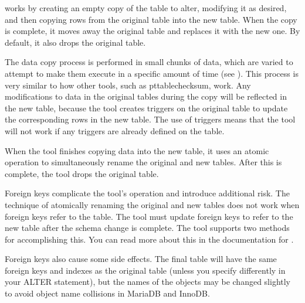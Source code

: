 \documentclass[letterpaper,10pt,english]{sphinxmanual}
\begin{document}
\sphinxAtStartPar
{} works by creating an empty copy of the table to alter,
modifying it as desired, and then copying rows from the original table into the
new table. When the copy is complete, it moves away the original table and
replaces it with the new one.  By default, it also drops the original table.

\sphinxAtStartPar
The data copy process is performed in small chunks of data, which are varied to
attempt to make them execute in a specific amount of time (see
{\hyperref[\detokenize{mariadb-schema-change:cmdoption-mariadb-schema-change-chunk-time}]{}}).  This process is very similar to how other tools, such as
pt\sphinxhyphen{}table\sphinxhyphen{}checksum, work.  Any modifications to data in the original tables
during the copy will be reflected in the new table, because the tool creates
triggers on the original table to update the corresponding rows in the new
table.  The use of triggers means that the tool will not work if any triggers
are already defined on the table.

\sphinxAtStartPar
When the tool finishes copying data into the new table, it uses an atomic
 operation to simultaneously rename the original and new tables.
After this is complete, the tool drops the original table.

\sphinxAtStartPar
Foreign keys complicate the tool’s operation and introduce additional risk.  The
technique of atomically renaming the original and new tables does not work when
foreign keys refer to the table. The tool must update foreign keys to refer to
the new table after the schema change is complete. The tool supports two methods
for accomplishing this. You can read more about this in the documentation for
{\hyperref[\detokenize{mariadb-schema-change:cmdoption-mariadb-schema-change-alter-foreign-keys-method}]{}}.

\sphinxAtStartPar
Foreign keys also cause some side effects. The final table will have the same
foreign keys and indexes as the original table (unless you specify differently
in your ALTER statement), but the names of the objects may be changed slightly
to avoid object name collisions in MariaDB and InnoDB.
\end{document}

